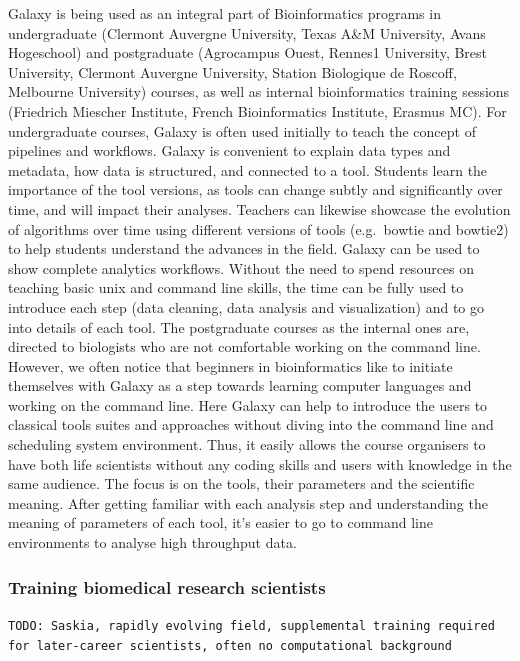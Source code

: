 \documentclass[10pt,letterpaper]{article}
\begin{document}
Galaxy is being used as an integral part of Bioinformatics programs in undergraduate (Clermont Auvergne University, Texas A\&M University, Avans Hogeschool) and postgraduate (Agrocampus Ouest, Rennes1 University, Brest University, Clermont Auvergne University, Station Biologique de Roscoff, Melbourne University) courses, as well as internal bioinformatics training sessions (Friedrich Miescher Institute, French Bioinformatics Institute, Erasmus MC).
For undergraduate courses, Galaxy is often used initially to teach the concept of pipelines and workflows.
Galaxy is convenient to explain data types and metadata, how data is structured, and connected to a tool.
Students learn the importance of the tool versions, as tools can change subtly and significantly over time, and will impact their analyses. Teachers can likewise showcase the evolution of algorithms over time using different versions of tools (e.g.\ bowtie and bowtie2) to help students understand the advances in the field. Galaxy can be used to show complete analytics workflows.
Without the need to spend resources on teaching basic unix and command line skills, the time can be fully used to introduce each step (data cleaning, data analysis and visualization) and to go into details of each tool.
The postgraduate courses as the internal ones are, directed to biologists who are not comfortable working on the command line.
However, we often notice that beginners in bioinformatics like to initiate themselves with Galaxy as a step towards learning computer languages and working on the command line.
Here Galaxy can help to introduce the users to classical tools suites and approaches without diving into the command line and scheduling system environment.
Thus, it easily allows the course organisers to have both life scientists without any coding skills and users with knowledge in the same audience. The focus is on the tools, their parameters and the scientific meaning.
After getting familiar with each analysis step and understanding the meaning of parameters of each tool, it’s easier to go to command line environments to analyse high throughput data.


\subsubsection*{Training biomedical research scientists}

\verb+TODO: Saskia, rapidly evolving field, supplemental training required for later-career scientists, often no computational background+
\end{document}
